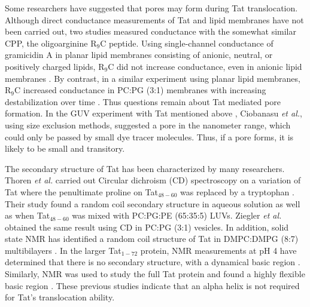 Some researchers have suggested that pores may form during Tat translocation.
Although direct conductance 
measurements of Tat and lipid membranes have not been carried out, two studies 
measured conductance with the somewhat similar CPP, the oligoarginine R$_9$C peptide. 
Using single-channel conductance of gramicidin A in planar lipid membranes 
consisting of anionic, neutral, or positively charged lipids, R$_9$C did not 
increase conductance, even in anionic lipid membranes \cite{Gurnev13}. 
By contrast, in a similar experiment using planar lipid membranes, 
R$_9$C increased conductance in PC:PG (3:1) membranes with increasing destabilization 
over time \cite{Herce09}. 
Thus questions remain about Tat mediated pore formation. 
In the GUV experiment with Tat mentioned above \cite{Ciobanasu10},
Ciobanasu \textit{et al.}, using size exclusion methods, suggested a pore in the 
nanometer range, which could only be passed by small dye tracer molecules. Thus, 
if a pore forms, it is likely to be small and transitory.

The secondary structure of Tat has been characterized by many researchers. 
Thoren \textit{et al.} carried out Circular dichroism (CD) spectroscopy on a 
variation of Tat where the penultimate proline on Tat$_{48-60}$ was replaced by a
tryptophan \cite{Thoren04}. 
Their study found a random coil secondary structure 
in aqueous solution as well as when Tat$_{48-60}$ was mixed with PC:PG:PE (65:35:5) LUVs. 
Ziegler \textit{et al.} \cite{Ziegler05} obtained the same result using CD in 
PC:PG (3:1) vesicles. In addition, solid state NMR has identified a random coil 
structure of Tat in DMPC:DMPG (8:7) multibilayers \cite{Su10}. 
In the larger Tat$_{1-72}$ protein, NMR measurements at pH 4 have determined that there 
is no secondary structure, with a dynamical basic region \cite{Shojania06}. 
Similarly, NMR was used to study the full Tat protein and found a highly 
flexible basic region \cite{Bayer95}. These previous studies indicate that 
an alpha helix is not required for Tat’s translocation ability. 

